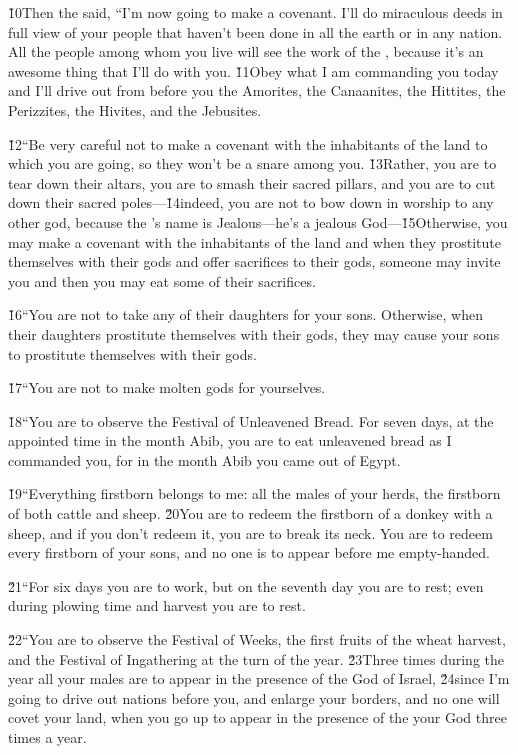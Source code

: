 \v{10}Then the  said, ``I'm now going to make a covenant. I'll do miraculous deeds in full view of your people that haven't been done in all the earth or in any nation. All the people among whom you live will see the work of the , because it's an awesome thing that I'll do with you. \v{11}Obey what I am commanding you today and I'll drive out from before you the Amorites, the Canaanites, the Hittites, the Perizzites, the Hivites, and the Jebusites.

\v{12}``Be very careful not to make a covenant with the inhabitants of the land to which you are going, so they won't be a snare among you. \v{13}Rather, you are to tear down their altars, you are to smash their sacred pillars, and you are to cut down their sacred poles---\v{14}indeed, you are not to bow down in worship to any other god, because the 's name is Jealous---he's a jealous God---\v{15}Otherwise, you may make a covenant with the inhabitants of the land and when they prostitute themselves with their gods and offer sacrifices to their gods, someone may invite you and then you may eat some of their sacrifices.

\v{16}``You are not to take any of their daughters for your sons. Otherwise, when their daughters prostitute themselves with their gods, they may cause your sons to prostitute themselves with their gods.

\v{17}``You are not to make molten gods for yourselves.

\v{18}``You are to observe the Festival of Unleavened Bread. For seven days, at the appointed time in the month Abib, you are to eat unleavened bread as I commanded you, for in the month Abib you came out of Egypt.

\v{19}``Everything firstborn belongs to me: all the males of your herds, the firstborn of both cattle and sheep. \v{20}You are to redeem the firstborn of a donkey with a sheep, and if you don't redeem it, you are to break its neck. You are to redeem every firstborn of your sons, and no one is to appear before me empty-handed.

\v{21}``For six days you are to work, but on the seventh day you are to rest; even during plowing time and harvest you are to rest.

\v{22}``You are to observe the Festival of Weeks, the first fruits of the wheat harvest, and the Festival of Ingathering at the turn of the year. \v{23}Three times during the year all your males are to appear in the presence of the  God of Israel, \v{24}since I'm going to drive out nations before you, and enlarge your borders, and no one will covet your land, when you go up to appear in the presence of the  your God three times a year.

